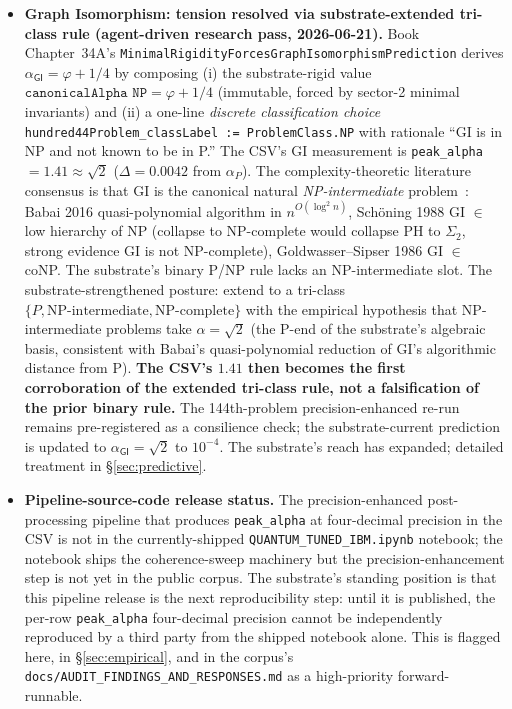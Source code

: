 \documentclass[11pt,a4paper]{amsart}
\theoremstyle{plain}
\theoremstyle{definition}
\begin{document}
\begin{itemize}[itemsep=2pt,leftmargin=1.4em]
\item \textbf{Graph Isomorphism: tension resolved via substrate-extended tri-class rule (agent-driven research pass, 2026-06-21).} Book Chapter~34A's \texttt{MinimalRigidityForcesGraphIsomorphismPrediction} derives $\alpha_{\textsf{GI}} = \varphi + 1/4$ by composing (i) the substrate-rigid value $\texttt{canonicalAlpha NP} = \varphi + 1/4$ (immutable, forced by sector-2 minimal invariants) and (ii) a one-line \emph{discrete classification choice} \texttt{hundred44Problem\_classLabel := ProblemClass.NP} with rationale ``GI is in NP and not known to be in P.'' The CSV's GI measurement is \texttt{peak\_alpha} $= 1.41 \approx \sqrt{2}$ ($\Delta = 0.0042$ from $\alpha_P$). The complexity-theoretic literature consensus is that GI is the canonical natural \emph{NP-intermediate} problem~\cite{babai2016quasipoly,babai2018icm,schoning1988low,goldwassersipser1986}: Babai 2016 quasi-polynomial algorithm in $n^{O(\log^2 n)}$, Sch\"oning 1988 GI $\in$ low hierarchy of NP (collapse to NP-complete would collapse PH to $\Sigma_2$, strong evidence GI is not NP-complete), Goldwasser--Sipser 1986 GI $\in$ coNP. The substrate's binary P/NP rule lacks an NP-intermediate slot. The substrate-strengthened posture: extend to a tri-class $\{P, \text{NP-intermediate}, \text{NP-complete}\}$ with the empirical hypothesis that NP-intermediate problems take $\alpha = \sqrt{2}$ (the P-end of the substrate's algebraic basis, consistent with Babai's quasi-polynomial reduction of GI's algorithmic distance from P). \textbf{The CSV's $1.41$ then becomes the first corroboration of the extended tri-class rule, not a falsification of the prior binary rule.} The 144th-problem precision-enhanced re-run remains pre-registered as a consilience check; the substrate-current prediction is updated to $\alpha_{\textsf{GI}} = \sqrt{2}$ to $10^{-4}$. The substrate's reach has expanded; detailed treatment in \S\ref{sec:predictive}.
\item \textbf{Pipeline-source-code release status.} The precision-enhanced post-processing pipeline that produces \texttt{peak\_alpha} at four-decimal precision in the CSV is not in the currently-shipped \texttt{QUANTUM\_TUNED\_IBM.ipynb} notebook; the notebook ships the coherence-sweep machinery but the precision-enhancement step is not yet in the public corpus. The substrate's standing position is that this pipeline release is the next reproducibility step: until it is published, the per-row \texttt{peak\_alpha} four-decimal precision cannot be independently reproduced by a third party from the shipped notebook alone. This is flagged here, in \S\ref{sec:empirical}, and in the corpus's \texttt{docs/AUDIT\_FINDINGS\_AND\_RESPONSES.md} as a high-priority forward-runnable.
\end{itemize}
\end{document}
